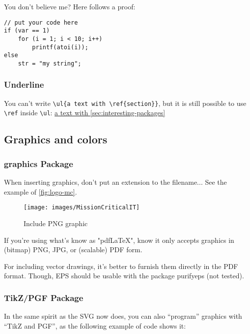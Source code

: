 \documentclass{mcreport}
\begin{document}
You don't believe me?  Here follows a proof:

\lstset{language=C}
\begin{lstlisting}
// put your code here
if (var == 1)
    for (i = 1; i < 10; i++)
        printf(atoi(i));
else
    str = "my string";
\end{lstlisting}

\subsubsection{Underline}

You can't write \verb|\ul{a text with \ref{section}}|, but it is still
possible to use \verb|\ref| inside \verb|\ul|:
\ul{a text with \mbox{\autoref{sec:interesting-packages}}}

\subsection{Graphics and colors}
\label{sec:graphics-colors}

\subsubsection{graphics Package}

When inserting graphics, don't put an extension to the filename... See the
example of \autoref{fig:logo-mc}.

\begin{figure}[!ht]
    \centering
    \texttt{[image: images/MissionCriticalIT]}
    \caption{Include PNG graphic}
    \label{fig:logo-mc}
\end{figure}

If you're using what's know as "pdfLaTeX", know it only accepts graphics in
(bitmap) PNG, JPG, or (scalable) PDF form.

\begin{mcnote}
    For including vector drawings, it's better to furnish them directly in
    the PDF format.
    Though, EPS should be usable with the package purifyeps (not tested).
\end{mcnote}

\subsubsection{TikZ/PGF Package}

In the same spirit as the \acs{SVG} now does, you can also ``program''
graphics with ``TikZ and PGF'', as the following example of code shows it:
\end{document}
